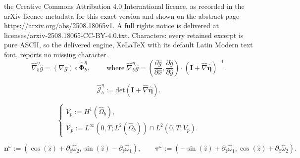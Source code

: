 \documentclass[10pt,a4paper]{amsart}
\newcommand{\bd}{\boldsymbol}
\begin{document}
the Creative Commons Attribution 4.0 International licence, as recorded in the arXiv licence metadata for this exact version and shown on the abstract page https://arxiv.org/abs/2508.18065v1. A full rights notice is delivered at licenses/arxiv-2508.18065-CC-BY-4.0.txt. Characters: every retained excerpt is pure ASCII, so the delivered engine, XeLaTeX with its default Latin Modern text font, reports no missing character.
\begin{equation}\label{etanabla}
\hat{\nabla}^{\eta}_{b}\hat{g} = (\nabla g) \circ \hat{\bd{\Phi}}^{\eta}_{b}, \qquad \text{ where } \hat{\nabla}^{\eta}_{b} \hat{g} = \left(\frac{\partial \hat{g}}{\partial \hat{x}}, \frac{\partial \hat{g}}{\partial \hat{y}}\right) \cdot (\bd{I} + \hat{\nabla} \hat{\bd{\eta}})^{-1}.
\end{equation}

\begin{equation}\label{jeta}
\hat{\mathcal{J}}^{\eta}_{b} := \text{det}(\bd{I} + \hat{\nabla} \hat{\bd{\eta}}).
\end{equation}

\begin{equation}\label{Vp}
\begin{cases}
V_{p} := H^{1}(\hat{\Omega}_{b}), \\
\mathcal{V}_{p} := L^{\infty}(0, T; L^{2}(\hat{\Omega}_{b})) \cap L^{2}(0, T; V_{p}).
\end{cases}
\end{equation}

\begin{equation}\label{ntomega}
\bd{n}^{\omega} := (\cos(\hat{z}) + \partial_{\hat{z}}\hat{\omega}_{2}, \sin(\hat{z}) - \partial_{\hat{z}}\hat{\omega}_{1}), \qquad \bd{\tau}^{\omega} := (-\sin(\hat{z}) + \partial_{\hat{z}}\hat{\omega}_{1}, \cos(\hat{z}) + \partial_{\hat{z}}\hat{\omega}_{2}).
\end{equation}
\end{document}
